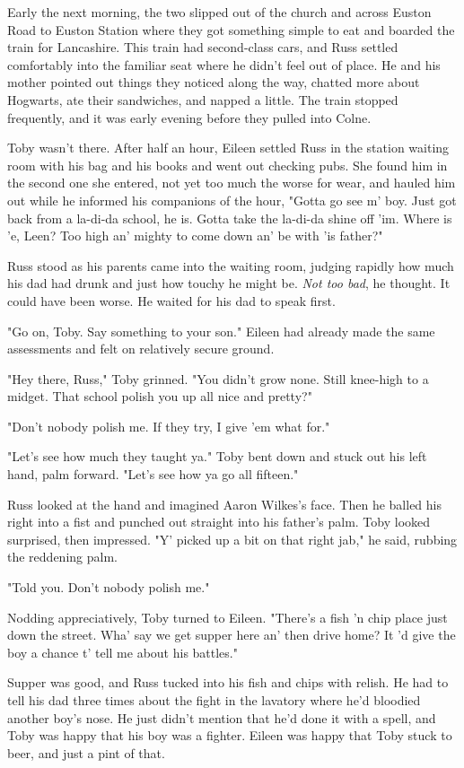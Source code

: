 \documentclass[a4paper,11pt]{article}
\begin{document}
Early the next morning, the two slipped out of the church and across Euston Road to Euston Station where they got something simple to eat and boarded the train for Lancashire. This train had second-class cars, and Russ settled comfortably into the familiar seat where he didn't feel out of place. He and his mother pointed out things they noticed along the way, chatted more about Hogwarts, ate their sandwiches, and napped a little. The train stopped frequently, and it was early evening before they pulled into Colne.

Toby wasn't there. After half an hour, Eileen settled Russ in the station waiting room with his bag and his books and went out checking pubs. She found him in the second one she entered, not yet too much the worse for wear, and hauled him out while he informed his companions of the hour, "Gotta go see m' boy. Just got back from a la-di-da school, he is. Gotta take the la-di-da shine off 'im. Where is 'e, Leen? Too high an' mighty to come down an' be with 'is father?"

Russ stood as his parents came into the waiting room, judging rapidly how much his dad had drunk and just how touchy he might be. \emph{Not too bad}, he thought. It could have been worse. He waited for his dad to speak first.

"Go on, Toby. Say something to your son." Eileen had already made the same assessments and felt on relatively secure ground.

"Hey there, Russ," Toby grinned. "You didn't grow none. Still knee-high to a midget. That school polish you up all nice and pretty?"

"Don't nobody polish me. If they try, I give 'em what for."

"Let's see how much they taught ya." Toby bent down and stuck out his left hand, palm forward. "Let's see how ya go all fifteen."

Russ looked at the hand and imagined Aaron Wilkes's face. Then he balled his right into a fist and punched out straight into his father's palm. Toby looked surprised, then impressed. "Y' picked up a bit on that right jab," he said, rubbing the reddening palm.

"Told you. Don't nobody polish me."

Nodding appreciatively, Toby turned to Eileen. "There's a fish 'n chip place just down the street. Wha' say we get supper here an' then drive home? It 'd give the boy a chance t' tell me about his battles."

Supper was good, and Russ tucked into his fish and chips with relish. He had to tell his dad three times about the fight in the lavatory where he'd bloodied another boy's nose. He just didn't mention that he'd done it with a spell, and Toby was happy that his boy was a fighter. Eileen was happy that Toby stuck to beer, and just a pint of that.
\end{document}
